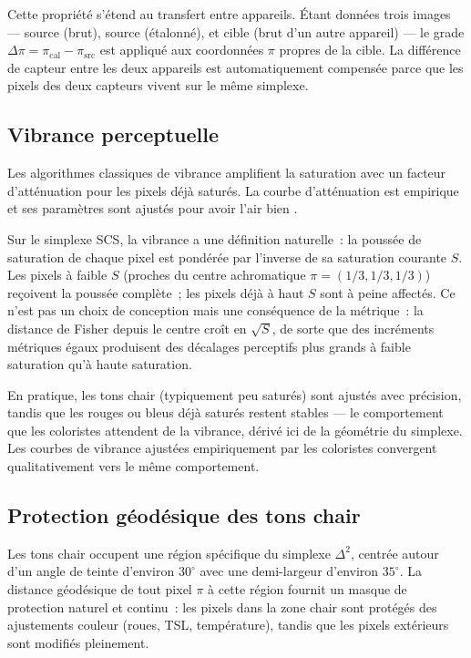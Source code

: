 \documentclass[12pt,a4paper]{article}
\begin{document}
Cette propri\'et\'e s'\'etend au transfert entre appareils. \'Etant
donn\'ees trois images --- source (brut), source (\'etalonn\'e), et
cible (brut d'un autre appareil) --- le grade
$\Delta\pi = \pi_\mathrm{cal} - \pi_\mathrm{src}$ est
appliqu\'e aux coordonn\'ees $\pi$ propres de la cible. La
diff\'erence de capteur entre les deux appareils est automatiquement
compens\'ee parce que les pixels des deux capteurs vivent sur le m\^eme
simplexe.

\subsection{Vibrance perceptuelle}

Les algorithmes classiques de vibrance amplifient la saturation avec un
facteur d'att\'enuation pour les pixels d\'ej\`a satur\'es. La courbe
d'att\'enuation est empirique et ses param\`etres sont ajust\'es pour
\og avoir l'air bien \fg.

Sur le simplexe SCS, la vibrance a une d\'efinition naturelle~: la
pouss\'ee de saturation de chaque pixel est pond\'er\'ee par l'inverse
de sa saturation courante $S$. Les pixels \`a faible $S$ (proches du
centre achromatique $\pi = (1/3, 1/3, 1/3)$) re\c{c}oivent la
pouss\'ee compl\`ete~; les pixels d\'ej\`a \`a haut $S$ sont \`a peine
affect\'es. Ce n'est pas un choix de conception mais une cons\'equence
de la m\'etrique~: la distance de Fisher depuis le centre cro\^it en
$\sqrt{S}$, de sorte que des incr\'ements m\'etriques \'egaux
produisent des d\'ecalages perceptifs plus grands \`a faible saturation
qu'\`a haute saturation.

En pratique, les tons chair (typiquement peu satur\'es) sont ajust\'es
avec pr\'ecision, tandis que les rouges ou bleus d\'ej\`a satur\'es
restent stables --- le comportement que les coloristes attendent de la
vibrance, d\'eriv\'e ici de la g\'eom\'etrie du simplexe. Les courbes
de vibrance ajust\'ees empiriquement par les coloristes convergent
qualitativement vers le m\^eme comportement.

\subsection{Protection g\'eod\'esique des tons chair}

Les tons chair occupent une r\'egion sp\'ecifique du simplexe
$\Delta^2$, centr\'ee autour d'un angle de teinte d'environ $30^\circ$
avec une demi-largeur d'environ $35^\circ$. La distance g\'eod\'esique de
tout pixel $\pi$ \`a cette r\'egion fournit un masque de protection
naturel et continu~: les pixels dans la zone chair sont prot\'eg\'es
des ajustements couleur (roues, TSL, temp\'erature), tandis que les
pixels ext\'erieurs sont modifi\'es pleinement.
\end{document}
